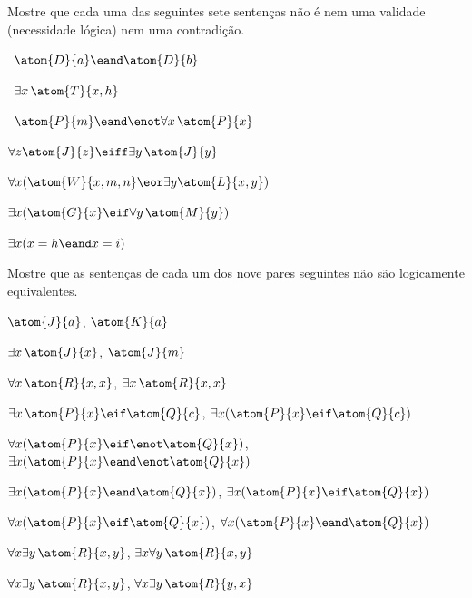 \solutions
\problempart
\label{pr.Contingent}
Mostre que cada uma das seguintes sete sentenças não é nem uma validade (necessidade lógica) nem uma contradição.
\begin{earg}
\item \leftsolutions\ $\atom{D}{a}  \eand \atom{D}{b}$
\item \leftsolutions\ $\exists x\, \atom{T}{x,h}$
\item \leftsolutions\ $\atom{P}{m}  \eand \enot\forall x\, \atom{P}{x}$
\item $\forall z \atom{J}{z} \eiff \exists y\, \atom{J}{y}$
\item $\forall x (\atom{W}{x,m,n} \eor \exists y\atom{L}{x,y})$
\item $\exists x (\atom{G}{x} \eif \forall y\, \atom{M}{y})$
\item $\exists x (x = h \eand x = i)$
\end{earg}

\solutions
\problempart
\label{pr.NotEquiv}
Mostre que as sentenças de cada um dos nove pares seguintes não são logicamente equivalentes.
\begin{earg}
\item $\atom{J}{a} $,  $\atom{K}{a}$
\item $\exists x\, \atom{J}{x}$,  $\atom{J}{m}$
\item $\forall x\, \atom{R}{x,x}$, $\exists x\, \atom{R}{x,x}$
\item $\exists x\, \atom{P}{x} \eif \atom{Q}{c}$, $\exists x (\atom{P}{x} \eif \atom{Q}{c})$
\item $\forall x(\atom{P}{x} \eif \enot \atom{Q}{x})$, $\exists x(\atom{P}{x} \eand \enot \atom{Q}{x})$
\item $\exists x(\atom{P}{x} \eand \atom{Q}{x})$, $\exists x(\atom{P}{x} \eif \atom{Q}{x})$
\item $\forall x(\atom{P}{x}\eif \atom{Q}{x})$, $\forall x(\atom{P}{x} \eand \atom{Q}{x})$
\item $\forall x\exists y\, \atom{R}{x,y}$, $\exists x\forall y\, \atom{R}{x,y}$
\item $\forall x\exists y\, \atom{R}{x,y}$, $\forall x\exists y\, \atom{R}{y,x}$
\end{earg}

